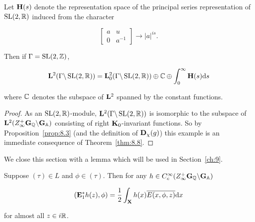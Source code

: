 \begin{example}\label{exa:8.10}

Let $\mathbf{H}(s)$ denote the representation space of the principal series representation of $\operatorname{SL}(2,\mathbb{R})$ induced from the character

\[
\begin{bmatrix} a & u \\ 0 & a^{-1} \end{bmatrix} \to |a|^{is}.
\]

Then if $\Gamma = \operatorname{SL}(2,\mathbb{Z})$,

\[
\mathbf{L}^{2}(\Gamma\backslash\operatorname{SL}(2,\mathbb{R})) = \mathbf{L}_{0}^{2}(\Gamma\backslash\operatorname{SL}(2,\mathbb{R})) \oplus \mathbb{C} \oplus \int_{0}^{\infty} \mathbf{H}(s) \mathrm{d} s
\]

where $\mathbb{C}$ denotes the subspace of $\mathbf{L}^{2}$ spanned by the constant functions.

\end{example}

\begin{proof}

As an $\operatorname{SL}(2,\mathbb{R})$-module, $\mathbf{L}^{2}(\Gamma\backslash\operatorname{SL}(2,\mathbb{R}))$ is isomorphic to the subspace of $\mathbf{L}^{2}(Z_{\infty}^{+}\mathbf{G}_{\mathbb{Q}}\backslash\mathbf{G}_{\mathbb{A}})$ consisting of right $\mathbf{K}_{0}$-invariant functions. So by Proposition~\ref{prop:8.3} (and the definition of $\mathbf{D}_{\chi}(g)$) this example is an immediate consequence of Theorem~\ref{thm:8.8}.

\end{proof}

We close this section with a lemma which will be used in Section~\ref{ch:9}.

\begin{lemma}\label{lem:8.11}

Suppose $(\tau) \in L$ and $\phi \in (\tau)$. Then for any $h \in C_{c}^{\infty}(Z_{\infty}^{+}\mathbf{G}_{\mathbb{Q}}\backslash\mathbf{G}_{\mathbb{A}})$

\[
(\mathbf{E}_{1}^{*}h(z),\phi) = \frac{1}{2}\int_{\mathbf{X}} h(x)\overline{E(x,\phi,z)} \mathrm{d} x
\]

for almost all $z \in i\mathbb{R}$.

\end{lemma}

